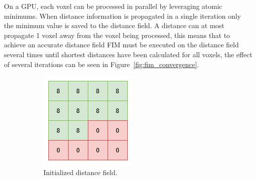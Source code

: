 On a GPU, each voxel can be processed in parallel by leveraging atomic minimums. When distance information is propagated
in a single iteration only the minimum value is saved to the distance field. A distance can at most propagate 1 voxel
away from the voxel being processed, this means that to achieve an accurate distance field FIM must be executed on the
distance field several times until shortest distances have been calculated for all voxels, the effect of several
iterations can be seen in Figure~\ref{fig:fim_convergence}.

\begin{figure}[htbp]
    \centering
    \begin{subfigure}[t]{0.24\textwidth}
        \centering
        \includegraphics[width=\textwidth]{figures/voxel_grid_fmm_init.drawio.png}
        \caption{Initialized distance field.}
    \end{subfigure}
    \hfill
    \begin{subfigure}[t]{0.24\textwidth}
        \centering

\end{subfigure}
\end{figure}
